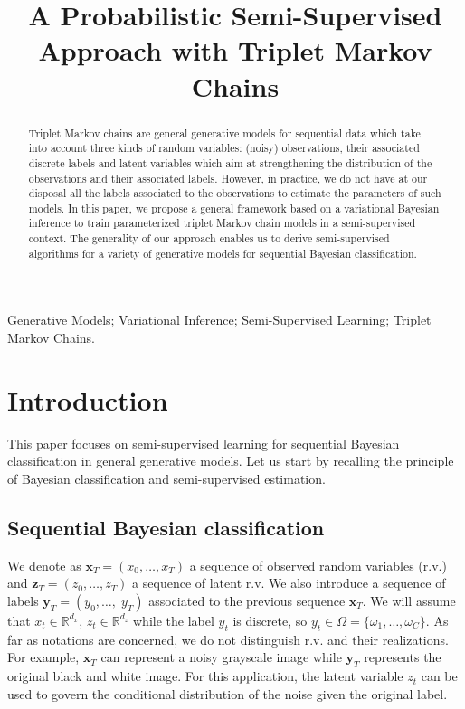 \documentclass{article}
\title{A Probabilistic Semi-Supervised Approach with Triplet Markov Chains}
\def\x{{\mathbf x}}
\def\z{{\mathbf z}}
\def\y{{\mathbf y}}
\begin{document}

\maketitle

\begin{abstract}
Triplet Markov chains are general generative models for sequential data which take into account three kinds of random variables: (noisy) observations, their associated discrete labels and latent variables which aim at strengthening the distribution of the observations and their associated labels.
However, in practice, we do not have at our disposal all the labels associated to the observations to estimate the parameters of such models. In this paper, we propose
a general framework based on a variational Bayesian inference to 
train parameterized triplet Markov chain models in a semi-supervised context. The generality of our approach enables us to derive semi-supervised
algorithms for a variety of generative models for sequential Bayesian classification.
\end{abstract}
%
\begin{keywords}
Generative Models; Variational Inference; Semi-Supervised Learning; Triplet Markov Chains.
\end{keywords}
%
\section{Introduction}
\label{sec:intro}
This paper focuses on semi-supervised 
learning for sequential Bayesian classification 
in general generative models. Let us start by
recalling the principle of Bayesian classification
and semi-supervised estimation.

\subsection{Sequential Bayesian classification}
We denote as $\x_T=(x_{0}, \dots, x_{T})$
a sequence of observed random variables (r.v.) and $\z_T=(z_{0}, \dots, z_{T})$ a sequence of latent r.v. We also introduce a sequence
of labels $\y_T=(y_{0}, \dots,\; y_{T})$ associated to the previous sequence $\x_T$. We will assume that  $x_t \in \mathbb{R}^{d_x}$, $z_t \in \mathbb{R}^{d_z}$ while the label
$y_t$ is discrete, so  $y_t \in \Omega=\{\omega_1,\dots,\omega_C\}$.
As far as notations are concerned, we do not distinguish r.v. and their realizations.
For example, $\x_T$ can represent a noisy grayscale image while $\y_T$ represents the original black and white image. For this application, the latent variable $z_t$ can be used to govern the conditional distribution of the noise given the original label.
\end{document}
